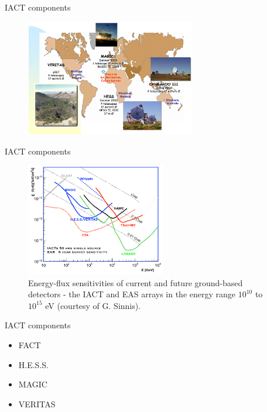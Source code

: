 \documentclass{beamer}
\begin{document}
\begin{frame}{IACT components}
	\begin{figure}[h]
		\includegraphics[width=280px]{telescopes.png}
	\end{figure}
\end{frame}


\begin{frame}{IACT components}
	\begin{figure}[h]
		\includegraphics[width=230px]{snesitivities.png}
		\caption{Energy-flux sensitivities of current and future ground-based detectors - the IACT and EAS arrays in the energy range $10^{10}$ to $10^{15}$ eV (courtesy of G. Sinnis).}
	\end{figure}
\end{frame}


\begin{frame}{IACT components}
	\begin{itemize}
		\item FACT
		\item H.E.S.S.
		\item MAGIC
		\item VERITAS
	\end{itemize}
\end{frame}
\end{document}
